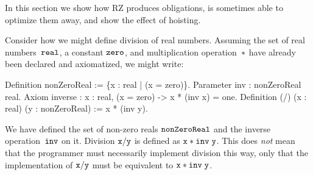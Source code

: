 In this section we show how RZ produces obligations, is sometimes able
to optimize them away, and show the effect of hoisting.

Consider how we might define division of real numbers. Assuming the
set of real numbers~$\mathtt{real}$, a constant $\mathtt{zero}$, and
multiplication operation~$\mathtt{*}$ have already been declared and
axiomatized, we might write:
%
\begin{source}
Definition nonZeroReal := \{x : real | \iNot (x = zero)\}.
Parameter inv : nonZeroReal \iTo real.
Axiom inverse : \iForall x : real, \iNot (x = zero) -> x * (inv x) = one.
Definition (/) (x : real) (y : nonZeroReal) := x * (inv y).
\end{source}
%
We have defined the set of non-zero reals $\mathtt{nonZeroReal}$ and
the inverse operation~$\mathtt{inv}$ on it. Division $\mathtt{x/y}$ is defined
as $\mathtt{x * inv\; y}$. This does \emph{not} mean that the
programmer must necessarily implement division this way, only that the
implementation of $\mathtt{x/y}$ must be equivalent to $\mathtt{x * inv\;y}$.

